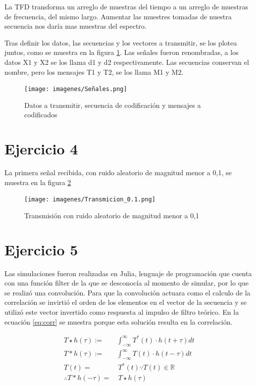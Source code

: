 \documentclass[12pt,letterpaper]{article}     %
\begin{document}
La TFD transforma un arreglo de muestras del tiempo a un arreglo de muestras de frecuencia, del mismo largo.
Aumentar las muestres tomadas de nuestra secuencia nos daría mas muestras del espectro.

Tras definir los datos, las secuencias y los vectores a transmitir, se los plotea juntos,
como se muestra en la figura \ref{fig:datos}.
Las señales fueron renombradas, a los datos X1 y X2 se los llama d1 y d2 respectivamente.
Las secuencias conservan el nombre, pero los mensajes T1 y T2, se los llama M1 y M2.

\begin{figure}[!ht]
\centering
\texttt{[image: imagenes/Señales.png]}
\caption{Datos a transmitir, secuencia de codificación y mensajes a codificados}
\label{fig:datos}
\end{figure}

\newpage
\section{Ejercicio 4}

La primera señal recibida, con ruido aleatorio de magnitud menor a 0,1, se muestra en
la figura \ref{fig:transimcion01}

\begin{figure}[!ht]
\centering
\texttt{[image: imagenes/Transmicion\_0.1.png]}
\caption{Transmisión con ruido aleatorio de magnitud menor a 0,1}
\label{fig:transimcion01}
\end{figure}

\section{Ejercicio 5}

Las simulaciones fueron realizadas en Julia, lenguaje de programación que cuenta con 
una función filter de la que se desconocía al momento de simular, por lo que se realizó una convolución.
Para que la convolución actuara como el calculo de la correlación se invirtió el orden
de los elementos en el vector de la secuencia y se utilizó este vector invertido como
respuesta al impulso de filtro teórico. En la ecuación \ref{eq:corr} se muestra porque esta 
solución resulta en la correlación.

\begin{equation}
	\label{eq:corr}
	\begin{split}
		T\star h(\tau) :=& \int_{-\infty}^{\infty} T^*(t)\cdot h(t+\tau)dt\\
		T\ast h(\tau) :=& \int_{-\infty}^{\infty} T(t)\cdot h(t-\tau)dt\\
		T(t) =&\ T^*(t) \because T(t)\in \mathbb{R}\\
		\therefore 		T\ast h(-\tau) =&\ T\star h(\tau)
	\end{split}
\end{equation}
\end{document}
